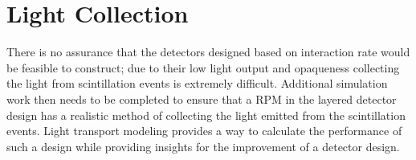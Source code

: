 


\section{Light Collection}
There is no assurance that the detectors designed based on interaction rate would be feasible to construct; due to their low light output and opaqueness collecting the light from scintillation events is extremely difficult.  
Additional simulation work then needs to be completed to ensure that a RPM in the layered detector design has a realistic method of collecting the light emitted from the scintillation events.
Light transport modeling provides a way to calculate the performance of such a design while providing insights for the improvement of a detector design.

